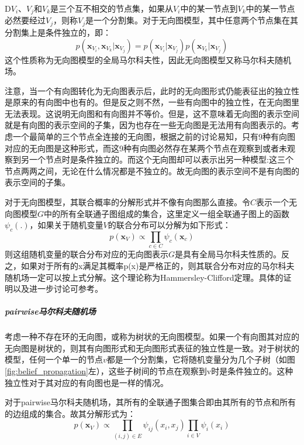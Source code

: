 D$V_i$、$V_j$和$V_k$是三个互不相交的节点集，如果从$V_i$中的某一节点到$V_k$中的某一节点必然要经过$V_j$，则称$V_j$是一个{分割集}。对于无向图模型，其中任意两个节点集在其分割集上是条件独立的，即：
\begin{equation}
p({\bm x}_{V_i},{\bm x}_{V_k}|{\bm x}_{V_j}) = p({\bm x}_{V_i}|{\bm x}_{V_j})p({\bm x}_{V_k}|{\bm x}_{V_j})
\end{equation}
这个性质称为无向图模型的全局马尔科夫性，因此无向图模型又称马尔科夫随机场。

注意，当一个有向图转化为无向图表示后，此时的无向图形式仍能表征出的独立性是原来的有向图中也有的。但是反之则不然，一些有向图中的独立性，在无向图里无法表现。这说明无向图和有向图并不等价。但是，这不意味着无向图的表示空间就是有向图的表示空间的子集，因为也存在一些无向图是无法用有向图表示的。考虑一个最简单的三个节点全连接的无向图，根据之前的讨论易知，只有9种有向图对应的无向图是这种形式，而这9种有向图必然存在某两个节点在观察到或者未观察到另一个节点时是条件独立的。而这个无向图却可以表示出另一种模型:这三个节点两两之间，无论在什么情况都是不独立的。故无向图的表示空间不是有向图的表示空间的子集。

对于无向图模型，其联合概率的分解形式并不像有向图那么直接。令$C$表示一个无向图模型$G$中的所有全联通子图组成的集合，这里定义一组全联通子图上的函数$\psi_c(.)$，如果关于随机变量$V$的联合分布可以分解为如下形式：
\begin{equation}
p({\bm x}_{V}) \propto \prod_{c \in C} \psi_c({\bm x}_c)
\end{equation}
则这组随机变量的联合分布对应的无向图表示$G$是具有全局马尔科夫性质的。反之，如果对于所有的x满足其概率p(x)是严格正的，则其联合分布对应的马尔科夫随机场一定可以按上式分解。这个理论称为Hammersley-Clifford定理。具体的证明以及进一步讨论可参考\cite{Besag:74,Clifford:90}。


\subparagraph{pairwise马尔科夫随机场}
考虑一种不存在环的无向图，或称为树状的无向图模型。如果一个有向图其对应的无向图是树状的，则其有向图形式和无向图形式表征的独立性是一致。对于树状的模型，任何一个单一的节点$v$都是一个分割集，它将随机变量分为几个子树（如图\ref{fig:belief_propagation}左），这些子树间的节点在观察到v时是条件独立的。这种独立性对于其对应的有向图也是一样的情况。

对于pairwise马尔科夫随机场，其所有的全联通子图集合即由其所有的节点和所有的边组成的集合。故其分解形式为：
\begin{equation}
p({\bm x}_{V}) \propto \prod_{(i,j) \in E} {\psi_{ij}(x_i,x_j)} \prod_{i \in V} \psi_{i}(x_i)
\end{equation}

